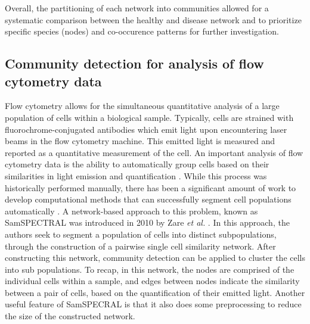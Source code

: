 \indent Overall, the partitioning of each network into communities allowed for a systematic comparison between the healthy and disease network and to prioritize specific species (nodes) and co-occurence patterns for further investigation. 

\subsection{Community detection for analysis of flow cytometry data}
\indent Flow cytometry allows for the simultaneous quantitative analysis of a large population of cells within a biological sample. Typically, cells are strained with fluorochrome-conjugated antibodies which emit light upon encountering laser beams in the flow cytometry machine. This emitted light is measured and reported as a quantitative measurement of the cell. An important analysis of flow cytometry data is the ability to automatically group cells based on their similarities in light emission and quantification \cite{flow}. While this process was historically performed manually, there has been a significant amount of work to develop computational methods that can successfully segment cell populations automatically \cite{nimaFlow}. A network-based approach to this problem, known as SamSPECTRAL was introduced in 2010 by Zare \emph{et al.} \cite{FlowSpectral}. In this approach, the authors seek to segment a population of cells into distinct subpopulations, through the construction of a pairwise single cell similarity network. After constructing this network, community detection can be applied to cluster the cells into sub populations. To recap, in this network, the nodes are comprised of the individual cells within a sample, and edges between nodes indicate the similarity between a pair of cells, based on the quantification of their emitted light. Another useful feature of SamSPECRAL is that it also does some preprocessing to reduce the size of the constructed network.

